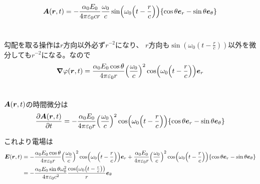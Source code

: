 \documentclass[../ap_2021.tex]{subfiles}
\begin{document}
\section{}
\begin{equation}\begin{aligned}[b]
    \vb*{A}(\vb*{r},t) = -\frac{\alpha_0E_0}{4\pi\varepsilon_0 cr} \frac{\omega_0}{c}\sin(\omega_0\qty(t-\frac{r}{c}))\qty{\cos\theta\vb*{e}_r-\sin\theta\vb*{e}_\theta}
\end{aligned}\end{equation}

\section{}
勾配を取る操作は\(r\)方向以外必ず\(r^{-2}\)になり、
\(r\)方向も\(\sin(\omega_0(t-\frac{r}{c}))\)以外を微分しても\(r^{-2}\)になる。なので
\begin{equation}\begin{aligned}[b]
    \grad{\varphi}(\vb*{r},t)=\frac{\alpha_0E_0\cos\theta}{4\pi\varepsilon_0r}\qty(\frac{\omega_0}{c})^2\cos(\omega_0\qty(t-\frac{r}{c}))\vb*{e}_r
\end{aligned}\end{equation}

\section{}
\(\vb*{A}(\vb*{r},t)\)の時間微分は
\begin{equation}\begin{aligned}[b]
    \pdv{\vb*{A}(\vb*{r},t)}{t}=-\frac{\alpha_0E_0}{4\pi\varepsilon_0 r} \qty(\frac{\omega_0}{c})^2\cos(\omega_0\qty(t-\frac{r}{c}))\qty{\cos\theta\vb*{e}_r-\sin\theta\vb*{e}_\theta}
\end{aligned}\end{equation}

これより電場は
\begin{equation}\begin{aligned}[b]
    \vb*{E}(\vb*{r},t)
    &=-\frac{\alpha_0E_0\cos\theta}{4\pi\varepsilon_0r}\qty(\frac{\omega_0}{c})^2\cos(\omega_0\qty(t-\frac{r}{c}))\vb*{e}_r
        +\frac{\alpha_0E_0}{4\pi\varepsilon_0 r} \qty(\frac{\omega_0}{c})^2\cos(\omega_0\qty(t-\frac{r}{c}))\qty{\cos\theta\vb*{e}_r-\sin\theta\vb*{e}_\theta}\\
    &= -\frac{\alpha_0E_0\sin\theta\omega_0^2}{4\pi\varepsilon_0c^2}\frac{\cos(\omega_0\qty(t-\frac{r}{c}))}{r}\vb*{e}_\theta
\end{aligned}\end{equation}
\end{document}
